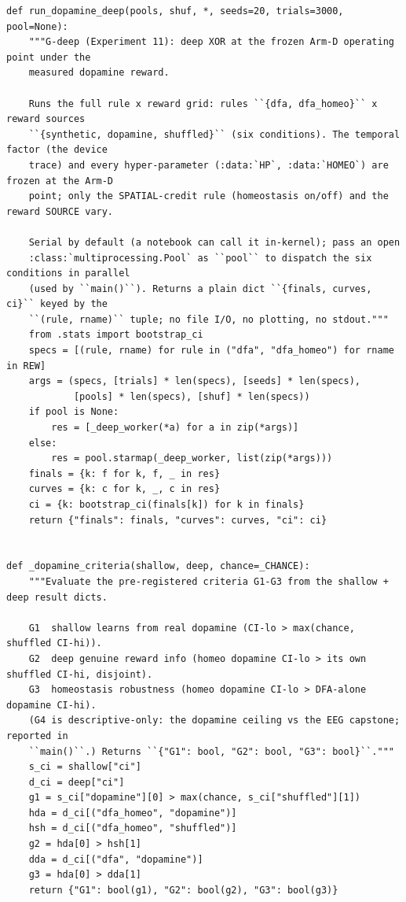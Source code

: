 \begin{lstlisting}[caption={mrl\_trace/dopamine.py},label={lst:siox-src-dopamine}]
def run_dopamine_deep(pools, shuf, *, seeds=20, trials=3000, pool=None):
    """G-deep (Experiment 11): deep XOR at the frozen Arm-D operating point under the
    measured dopamine reward.

    Runs the full rule x reward grid: rules ``{dfa, dfa_homeo}`` x reward sources
    ``{synthetic, dopamine, shuffled}`` (six conditions). The temporal factor (the device
    trace) and every hyper-parameter (:data:`HP`, :data:`HOMEO`) are frozen at the Arm-D
    point; only the SPATIAL-credit rule (homeostasis on/off) and the reward SOURCE vary.

    Serial by default (a notebook can call it in-kernel); pass an open
    :class:`multiprocessing.Pool` as ``pool`` to dispatch the six conditions in parallel
    (used by ``main()``). Returns a plain dict ``{finals, curves, ci}`` keyed by the
    ``(rule, rname)`` tuple; no file I/O, no plotting, no stdout."""
    from .stats import bootstrap_ci
    specs = [(rule, rname) for rule in ("dfa", "dfa_homeo") for rname in REW]
    args = (specs, [trials] * len(specs), [seeds] * len(specs),
            [pools] * len(specs), [shuf] * len(specs))
    if pool is None:
        res = [_deep_worker(*a) for a in zip(*args)]
    else:
        res = pool.starmap(_deep_worker, list(zip(*args)))
    finals = {k: f for k, f, _ in res}
    curves = {k: c for k, _, c in res}
    ci = {k: bootstrap_ci(finals[k]) for k in finals}
    return {"finals": finals, "curves": curves, "ci": ci}


def _dopamine_criteria(shallow, deep, chance=_CHANCE):
    """Evaluate the pre-registered criteria G1-G3 from the shallow + deep result dicts.

    G1  shallow learns from real dopamine (CI-lo > max(chance, shuffled CI-hi)).
    G2  deep genuine reward info (homeo dopamine CI-lo > its own shuffled CI-hi, disjoint).
    G3  homeostasis robustness (homeo dopamine CI-lo > DFA-alone dopamine CI-hi).
    (G4 is descriptive-only: the dopamine ceiling vs the EEG capstone; reported in
    ``main()``.) Returns ``{"G1": bool, "G2": bool, "G3": bool}``."""
    s_ci = shallow["ci"]
    d_ci = deep["ci"]
    g1 = s_ci["dopamine"][0] > max(chance, s_ci["shuffled"][1])
    hda = d_ci[("dfa_homeo", "dopamine")]
    hsh = d_ci[("dfa_homeo", "shuffled")]
    g2 = hda[0] > hsh[1]
    dda = d_ci[("dfa", "dopamine")]
    g3 = hda[0] > dda[1]
    return {"G1": bool(g1), "G2": bool(g2), "G3": bool(g3)}



\end{lstlisting}
